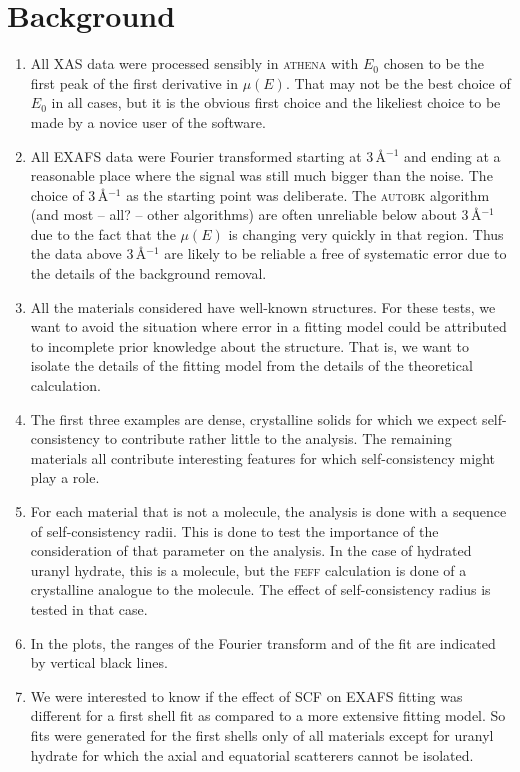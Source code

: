 \documentclass{article}
\let\stdsection\section
\renewcommand\section{\newpage\stdsection}
\begin{document}
\appendix


\section{Background}

\begin{enumerate}
\item All XAS data were processed sensibly in \textsc{athena} with
  $E_0$ chosen to be the first peak of the first derivative in
  $\mu(E)$.  That may not be the best choice of $E_0$ in all cases,
  but it is the obvious first choice and the likeliest choice to be
  made by a novice user of the software.
\item All EXAFS data were Fourier transformed starting at
  3\,\AA$^{-1}$ and ending at a reasonable place where the signal was
  still much bigger than the noise.  The choice of 3\,\AA$^{-1}$ as
  the starting point was deliberate.  The \textsc{autobk} algorithm
  (and most -- all? -- other algorithms) are often unreliable below
  about 3\,\AA$^{-1}$ due to the fact that the $\mu(E)$ is changing
  very quickly in that region.  Thus the data above 3\,\AA$^{-1}$ are
  likely to be reliable a free of systematic error due to the details
  of the background removal.
\item All the materials considered have well-known structures.  For
  these tests, we want to avoid the situation where error in a fitting
  model could be attributed to incomplete prior knowledge about the
  structure.  That is, we want to isolate the details of the fitting
  model from the details of the theoretical calculation.
\item The first three examples are dense, crystalline solids for which
  we expect self-consistency to contribute rather little to the
  analysis.  The remaining materials all contribute interesting
  features for which self-consistency might play a role.
\item For each material that is not a molecule, the analysis is done
  with a sequence of self-consistency radii.  This is done to test the
  importance of the consideration of that parameter on the analysis.
  In the case of hydrated uranyl hydrate, this is a molecule, but the
  \textsc{feff} calculation is done of a crystalline analogue to the
  molecule.  The effect of self-consistency radius is tested in that
  case.
\item In the plots, the ranges of the Fourier transform and of the fit
  are indicated by vertical black lines.
\item We were interested to know if the effect of SCF on EXAFS fitting
  was different for a first shell fit as compared to a more extensive
  fitting model.  So fits were generated for the first shells only of
  all materials except for uranyl hydrate for which the axial and
  equatorial scatterers cannot be isolated.
\end{enumerate}
\end{document}
